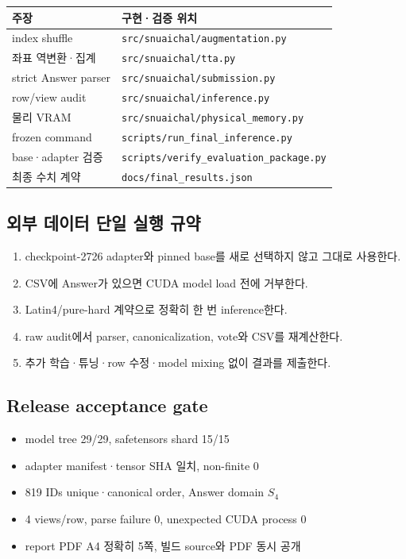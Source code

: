 \documentclass[9pt,a4paper]{extarticle}
\newcommand{\code}[1]{\texttt{\footnotesize #1}}
\begin{document}
\begin{multicols}{2}
\begin{tabularx}{\linewidth}{@{}lY@{}}
\toprule
주장 & 구현·검증 위치\\
\midrule
index shuffle & \code{src/snuaichal/augmentation.py}\\
좌표 역변환·집계 & \code{src/snuaichal/tta.py}\\
strict Answer parser & \code{src/snuaichal/submission.py}\\
row/view audit & \code{src/snuaichal/inference.py}\\
물리 VRAM & \code{src/snuaichal/physical\_memory.py}\\
frozen command & \code{scripts/run\_final\_inference.py}\\
base·adapter 검증 & \code{scripts/verify\_evaluation\_package.py}\\
최종 수치 계약 & \code{docs/final\_results.json}\\
\bottomrule
\end{tabularx}

\subsection{외부 데이터 단일 실행 규약}
\begin{enumerate}
\item checkpoint-2726 adapter와 pinned base를 새로 선택하지 않고 그대로 사용한다.
\item CSV에 Answer가 있으면 CUDA model load 전에 거부한다.
\item Latin4/pure-hard 계약으로 정확히 한 번 inference한다.
\item raw audit에서 parser, canonicalization, vote와 CSV를 재계산한다.
\item 추가 학습·튜닝·row 수정·model mixing 없이 결과를 제출한다.
\end{enumerate}

\subsection{Release acceptance gate}
\begin{itemize}
\item model tree 29/29, safetensors shard 15/15
\item adapter manifest·tensor SHA 일치, non-finite 0
\item 819 IDs unique·canonical order, Answer domain $S_4$
\item 4 views/row, parse failure 0, unexpected CUDA process 0
\item report PDF A4 정확히 5쪽, 빌드 source와 PDF 동시 공개
\end{itemize}


\end{multicols}
\end{document}
